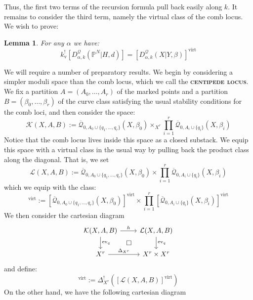 \documentclass[11pt]{amsart}
\newcommand{\Q}[4]{\overline{\mathcal Q}_{#1,#2}(#3,#4)}
\newcommand{\PP}{\mathbb P}
\newcommand{\virt}[1]{[#1]^{\operatorname{virt}}}
\newcommand{\ev}{\operatorname{ev}}
\newcommand{\ildef}[1]{\textbf{\textsc{#1}}}
\theoremstyle{plain}
\newtheorem{lem}[thm]{Lemma}
\theoremstyle{definition}
\begin{document}
Thus, the first two terms of the recursion formula pull back easily along $k$. It remains to consider the third term, namely the virtual class of the comb locus. We wish to prove:
\begin{lem} \label{Comb loci pull back} For any $\alpha$ we have:
\begin{equation*} k_{\text{v}}^! [D^\mathcal{Q}_{\alpha,k}(\PP^N|H,d)] = \virt{D^\mathcal{Q}_{\alpha,k}(X|Y,\beta)} \end{equation*} \end{lem}
We will require a number of preparatory results. We begin by considering a simpler moduli space than the comb locus, which we call the \ildef{centipede locus}. We fix a partition $A=(A_0,\ldots,A_r)$ of the marked points and a partition $B=(\beta_0, \ldots, \beta_r)$ of the curve class satisfying the usual stability conditions for the comb loci, and then consider the space:
\begin{equation*} \mathcal{K}(X,A,B) := \Q{0}{A_0 \cup \{ q_1, \ldots, q_r \}}{X}{\beta_0} \times_{X^r} \prod_{i=1}^r \Q{0}{A_i\cup\{q_i\}}{X}{\beta_i} \end{equation*}
Notice that the comb locus lives inside this space as a closed substack. We equip this space with a virtual class in the usual way by pulling back the product class along the diagonal. That is, we set
\begin{equation*} \mathcal{L}(X,A,B) :=  \Q{0}{A_0 \cup \{ q_1, \ldots, q_r \}}{X}{\beta_0} \times \prod_{i=1}^r \Q{0}{A_i\cup\{q_i\}}{X}{\beta_i} \end{equation*}
which we equip with the class:
\begin{equation*} \virt{\mathcal{L}(X,A,B)} := \virt{\Q{0}{A_0 \cup \{ q_1, \ldots, q_r \}}{X}{\beta_0}} \times \prod_{i=1}^r \virt{\Q{0}{A_i\cup\{q_i\}}{X}{\beta_i}} \end{equation*}
We then consider the cartesian diagram
\begin{equation} \label{Product diagram}
\begin{tikzcd}
\mathcal{K}(X,A,B) \ar[r,"h"] \ar[d,"\ev_q"] \ar[rd,phantom,"\square"] & \mathcal{L}(X,A,B) \ar[d,"\ev_q"] \\
X^r \ar[r,"\Delta_{X^r}"] & X^r \times X^r
\end{tikzcd}
\end{equation}
and define:
\begin{equation*} \virt{\mathcal{K}(X,A,B)} := \Delta_{X^r}^! (\virt{\mathcal{L}(X,A,B)}) \end{equation*}
On the other hand, we have the following cartesian diagram
\end{document}
